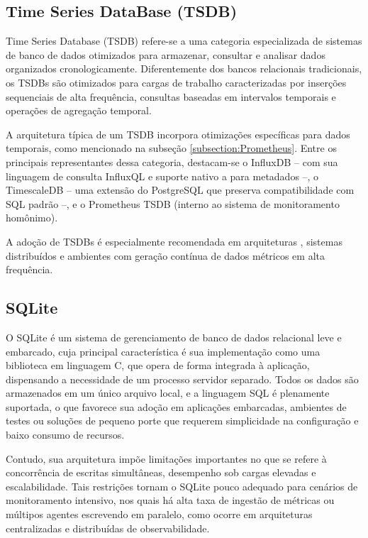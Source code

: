 \subsection{Time Series DataBase (TSDB)}
\label{subsection:TSDB}

Time Series Database (TSDB) \citep{tigerdata2024} refere-se a uma categoria especializada de sistemas de banco de dados otimizados para armazenar, consultar e analisar dados organizados cronologicamente. Diferentemente dos bancos relacionais tradicionais, os TSDBs são otimizados para cargas de trabalho caracterizadas por inserções sequenciais de alta frequência, consultas baseadas em intervalos temporais e operações de agregação temporal.

A arquitetura típica de um TSDB incorpora otimizações específicas para dados temporais, como mencionado na subseção \ref{subsection:Prometheus}. Entre os principais representantes dessa categoria, destacam-se o InfluxDB -- com sua linguagem de consulta InfluxQL e suporte nativo a  para metadados --, o TimescaleDB -- uma extensão do PostgreSQL que preserva compatibilidade com SQL padrão --, e o Prometheus TSDB (interno ao sistema de monitoramento homônimo).

A adoção de TSDBs é especialmente recomendada em arquiteturas , sistemas distribuídos e ambientes com geração contínua de dados métricos em alta frequência.

\subsection{SQLite}
\label{subsection:SQLite}

O SQLite \citep{sqlite2025} é um sistema de gerenciamento de banco de dados relacional leve e embarcado, cuja principal característica é sua implementação como uma biblioteca em linguagem C, que opera de forma integrada à aplicação, dispensando a necessidade de um processo servidor separado. Todos os dados são armazenados em um único arquivo local, e a linguagem SQL é plenamente suportada, o que favorece sua adoção em aplicações embarcadas, ambientes de testes ou soluções de pequeno porte que requerem simplicidade na configuração e baixo consumo de recursos.

Contudo, sua arquitetura impõe limitações importantes no que se refere à concorrência de escritas simultâneas, desempenho sob cargas elevadas e escalabilidade. Tais restrições tornam o SQLite pouco adequado para cenários de monitoramento intensivo, nos quais há alta taxa de ingestão de métricas ou múltipos agentes escrevendo em paralelo, como ocorre em arquiteturas centralizadas e distribuídas de observabilidade.

